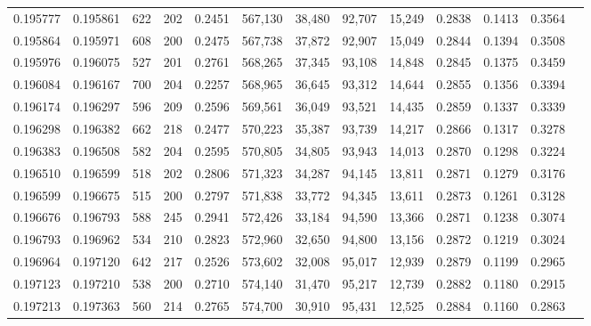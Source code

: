 \begin{tabular}{rrrrrrrrrrrrr}
0.195777 & 0.195861 &   622 & 202 &                                     0.2451 & 567,130 &  38,480 &  92,707 &  15,249 & 0.2838 & 0.1413 & 0.3564 \\
0.195864 & 0.195971 &   608 & 200 &                                     0.2475 & 567,738 &  37,872 &  92,907 &  15,049 & 0.2844 & 0.1394 & 0.3508 \\
0.195976 & 0.196075 &   527 & 201 &                                     0.2761 & 568,265 &  37,345 &  93,108 &  14,848 & 0.2845 & 0.1375 & 0.3459 \\
0.196084 & 0.196167 &   700 & 204 &                                     0.2257 & 568,965 &  36,645 &  93,312 &  14,644 & 0.2855 & 0.1356 & 0.3394 \\
0.196174 & 0.196297 &   596 & 209 &                                     0.2596 & 569,561 &  36,049 &  93,521 &  14,435 & 0.2859 & 0.1337 & 0.3339 \\
0.196298 & 0.196382 &   662 & 218 &                                     0.2477 & 570,223 &  35,387 &  93,739 &  14,217 & 0.2866 & 0.1317 & 0.3278 \\
0.196383 & 0.196508 &   582 & 204 &                                     0.2595 & 570,805 &  34,805 &  93,943 &  14,013 & 0.2870 & 0.1298 & 0.3224 \\
0.196510 & 0.196599 &   518 & 202 &                                     0.2806 & 571,323 &  34,287 &  94,145 &  13,811 & 0.2871 & 0.1279 & 0.3176 \\
0.196599 & 0.196675 &   515 & 200 &                                     0.2797 & 571,838 &  33,772 &  94,345 &  13,611 & 0.2873 & 0.1261 & 0.3128 \\
0.196676 & 0.196793 &   588 & 245 &                                     0.2941 & 572,426 &  33,184 &  94,590 &  13,366 & 0.2871 & 0.1238 & 0.3074 \\
0.196793 & 0.196962 &   534 & 210 &                                     0.2823 & 572,960 &  32,650 &  94,800 &  13,156 & 0.2872 & 0.1219 & 0.3024 \\
0.196964 & 0.197120 &   642 & 217 &                                     0.2526 & 573,602 &  32,008 &  95,017 &  12,939 & 0.2879 & 0.1199 & 0.2965 \\
0.197123 & 0.197210 &   538 & 200 &                                     0.2710 & 574,140 &  31,470 &  95,217 &  12,739 & 0.2882 & 0.1180 & 0.2915 \\
0.197213 & 0.197363 &   560 & 214 &                                     0.2765 & 574,700 &  30,910 &  95,431 &  12,525 & 0.2884 & 0.1160 & 0.2863 \\

\end{tabular}

